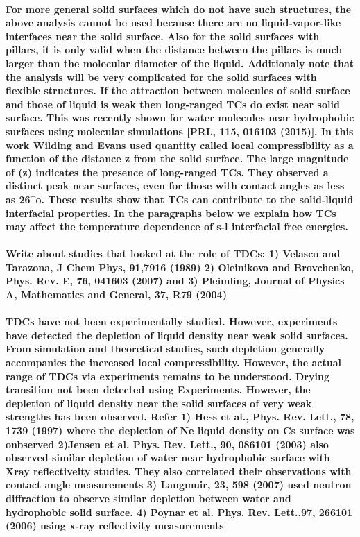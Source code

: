 \documentclass[a4paper,12pt,single,pdftex]{scrartcl}
\begin{document}
{\label{ID_1590536878}\paragraph{For more general solid surfaces which do not have such structures, the above analysis cannot be used because there are no liquid-vapor-like interfaces near the solid surface. Also for the solid surfaces with pillars, it is only valid when the distance between the pillars is much larger than the molecular diameter of the liquid. Additionaly note that the analysis will be very complicated for the solid surfaces with flexible structures. If the attraction between molecules of solid surface and those of liquid is weak then long-ranged TCs do exist near solid surface. This was recently shown for water molecules near hydrophobic surfaces using molecular simulations [PRL, 115, 016103 (2015)]. In this work Wilding and Evans used quantity called local compressibility \chi as a function of the distance z from the solid surface. The large magnitude of \chi (z) indicates the presence of long-ranged TCs. They observed a distinct peak near surfaces, even for those with contact angles as less as 26^{o}. These results show that TCs can contribute to the solid-liquid interfacial properties. In the paragraphs below we explain how TCs may affect the temperature dependence of  s-l interfacial free energies.}

\label{ID_908289338}\paragraph{Write about studies that looked at the role of TDCs: 1) Velasco and Tarazona, J Chem Phys, 91,7916 (1989) 2) Oleinikova and Brovchenko, Phys. Rev. E, 76, 041603 (2007) and 3) Pleimling, Journal of Physics A, Mathematics and General, 37, R79 (2004)}

\label{ID_1933251243}\paragraph{TDCs have not been experimentally studied. However, experiments have detected the depletion of liquid density near weak solid surfaces. From simulation and theoretical studies, such depletion generally accompanies the increased local compressibility.  However, the actual range of TDCs via experiments remains to be understood. Drying transition not been detected using Experiments. However, the depletion of liquid density near the solid surfaces of very weak strengths has been observed. Refer 1) Hess et al., Phys. Rev. Lett., 78, 1739 (1997) where the depletion of Ne liquid density on Cs surface was onbserved 2)Jensen et al. Phys. Rev. Lett., 90, 086101 (2003) also observed similar depletion of water near hydrophobic surface with Xray reflectiveity studies. They also correlated their observations with contact angle measurements 3) Langmuir, 23, 598 (2007) used neutron diffraction to observe similar depletion between water and hydrophobic solid surface. 4) Poynar et al. Phys. Rev. Lett.,97, 266101 (2006) using x-ray reflectivity measurements}

}
\end{document}
